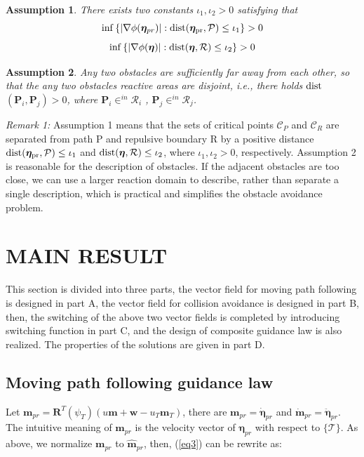 \documentclass[a4paper, 10pt, conference]{ieeeconf}      %
\newtheorem{assumption}{Assumption}
\begin{document}
\begin{assumption}\label{as1}
	There exists two constants $\iota_1,\iota_2>0$ satisfying that 
	\begin{equation}\label{eq11}		
		\inf{\{|\nabla \phi(\bm{\eta}_{pr})|:\rm{dist}(\bm{\eta}_{pr},\mathcal{P})\leq\iota_1\}}>0
	\end{equation}
	\begin{equation}\label{eq12}
		\inf{\{|\nabla \phi(\bm{\eta})|:\rm{dist}(\bm{\eta},\mathcal{R})\leq\iota_2\}}>0
	\end{equation}
\end{assumption}

\begin{assumption}\label{as2}
	 Any two obstacles are sufficiently far away from each other, so that the any two obstacles reactive areas are disjoint, i.e., there holds $\rm{dist}$$(\bm{P}_i,\bm{P}_j )>0$, where $\bm{P}_i\in^{in}\mathcal{R}_i$ , $\bm{P}_j\in^{in}\mathcal{R}_j$.
\end{assumption}

\emph{Remark 1:}
	 Assumption 1 means that the sets of critical points $\mathcal{C}_P$ and $\mathcal{C}_R$ are separated from path P and repulsive boundary R by a positive distance $\rm{dist}(\bm{\eta}_{pr},\mathcal{P})\leq\iota_1$ and $\rm{dist}(\bm{\eta},\mathcal{R})\leq\iota_2$, where $\iota_1, \iota_2>0$, respectively. Assumption 2 is reasonable for the description of obstacles. If the adjacent obstacles are too close, we can use a larger reaction domain to describe, rather than separate a single description, which is practical and simplifies the obstacle avoidance problem.

\section{MAIN RESULT}

This section is divided into three parts, the vector field for moving path following is designed in part A, the vector field for collision avoidance is designed in part B, then, the switching of the above two vector fields is completed by introducing switching function in part C, and the design of composite guidance law is also realized. The properties of the solutions are given in part D. 

\subsection{Moving path following guidance law} 
Let $\bm{m}_{pr}=\bm{R}^T (\psi_T)(u\bm{m} +\bm{w}-u_T\bm{m}_T)$, there are $\bm{m}_{pr}=\dot{\bm{\eta}}_{pr}$ and $\dot{\bm{m}}_{pr}=\ddot{\bm{\eta}}_{pr}$. The intuitive meaning of $\bm{m}_{pr}$ is the velocity vector of $\bm{\eta}_{pr}$ with respect to $\{\mathcal{T}\}$. As above, we normalize $\bm{m}_{pr}$ to $\hat{\bm{m}}_{pr}$, then, (\ref{eq3}) can be rewrite as:
\end{document}
